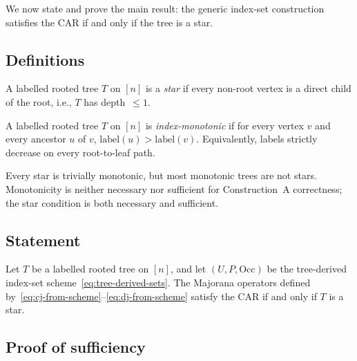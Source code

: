 %

We now state and prove the main result: the generic index-set
construction satisfies the CAR if and only if the tree is a star.

\subsection{Definitions}

\begin{definition}
\label{def:star}
A labelled rooted tree $T$ on $[n]$ is a \emph{star} if every
non-root vertex is a direct child of the root, i.e., $T$ has
depth~$\le 1$.
\end{definition}

\begin{definition}
\label{def:monotonic}
A labelled rooted tree $T$ on $[n]$ is \emph{index-monotonic} if for
every vertex $v$ and every ancestor $u$ of $v$,
$\mathrm{label}(u) > \mathrm{label}(v)$.  Equivalently, labels
strictly decrease on every root-to-leaf path.
\end{definition}

Every star is trivially monotonic, but most monotonic trees are not
stars.  Monotonicity is neither necessary nor sufficient for
Construction~A correctness; the star condition is both necessary and
sufficient.

\subsection{Statement}

\begin{theorem}
\label{thm:star-tree}
Let $T$ be a labelled rooted tree on $[n]$, and let $(U, P,
\mathrm{Occ})$ be the tree-derived index-set
scheme~\eqref{eq:tree-derived-sets}.  The Majorana operators defined
by~\eqref{eq:cj-from-scheme}--\eqref{eq:dj-from-scheme} satisfy the
CAR if and only if $T$ is a star.
\end{theorem}

\subsection{Proof of sufficiency}

